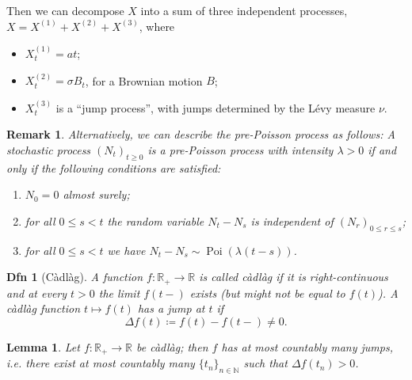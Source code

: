 \documentclass[a4paper]{article}
\theoremstyle{mytheoremstyle}
\newtheorem{definition}{Dfn}
\newtheorem{lemma}{Lemma}
\newtheorem*{remark}{Remark}
\newcommand{\1}{\mathds{1}}
\DeclareMathOperator{\Po}{Poi}
\begin{document}
\begin{multicols*}{3}
\begin{unlabeledbox}
  Then we can decompose $X$ into a sum of three independent processes, $X =
  X^{(1)} + X^{(2)} + X^{(3)}$, where
  \begin{itemize}
    \item $X^{(1)}_t = a t$;

    \item $X^{(2)}_t = \sigma B_t$, for a Brownian motion $B$;

    \item $X^{(3)}_t$ is a ``jump process'', with jumps determined by the
      L{\'e}vy measure $\nu$.
  \end{itemize}

  \begin{remark}
    \label{rmk:poisson-alternative}Alternatively, we can describe the
    pre-Poisson process as follows: A stochastic process $(N_t)_{t \geqslant 0}$
    is a pre-Poisson process with intensity $\lambda > 0$ if and only if the
    following conditions are satisfied:
    \begin{enumerate}
      \item $N_0 = 0$ almost surely;

      \item for all $0 \leqslant s < t$ the random variable $N_t - N_s$ is independent of
        $(N_r)_{0 \leqslant r \leqslant s}$;

      \item for all $0 \leqslant s < t$ we have $N_t - N_s \sim \Po (\lambda (t - s))$.
    \end{enumerate}
  \end{remark}

  \begin{definition}[C{\`a}dl{\`a}g]
    A function $f : \mathbb{R}_+ \rightarrow \mathbb{R}$ is called {\emph{c{\`a}dl{\`a}g}}
    if it is right-continuous and at every $t > 0$ the limit $f (t -)$ exists (but might
    not be equal to $f (t)$). A c{\`a}dl{\`a}g function $t \mapsto f (t)$ has a
    {\emph{jump}} at $t$ if \[ \Delta f (t) \coloneq f (t) - f (t -) \neq 0. \]
  \end{definition}

  \begin{lemma}
    Let $f : \mathbb{R}_+ \rightarrow \mathbb{R}$ be c{\`a}dl{\`a}g; then $f$ has at most
    countably many jumps, i.e. there exist at most countably many $\{ t_n \}_{n \in
    \mathbb{N}}$ such that $\Delta f (t_n) > 0$.
  \end{lemma}


\end{unlabeledbox}
\end{multicols*}
\end{document}
